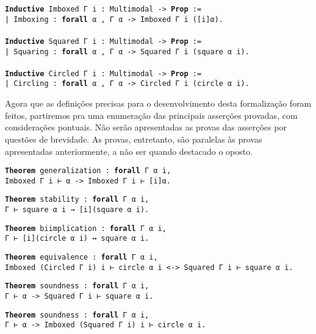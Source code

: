 \begin{mdframed}
\noindent
\texttt
{\noindent\footnotesize\textbf{Inductive} Imboxed Γ i : Multimodal -> \textbf{Prop} :=\\
| Imboxing : \textbf{forall} α , Γ α  -> Imboxed Γ i ([i]α).
\\
\\
\textbf{Inductive} Squared Γ i : Multimodal -> \textbf{Prop} :=\\
| Squaring : \textbf{forall} α , Γ α  -> Squared Γ i (square α i).
\\
\\
\textbf{Inductive} Circled Γ i : Multimodal -> \textbf{Prop} :=\\
| Circling : \textbf{forall} α , Γ α  -> Circled Γ i (circle α i).
}
\end{mdframed}
\hfill\break
Agora que as definições precisas para o desenvolvimento desta formalização foram feitos, partiremos pra uma enumeração das principais asserções provadas, com considerações pontuais.
Não serão apresentadas as provas das asserções por questões de brevidade.
As provas, entretanto, são paralelas às provas apresentadas anteriormente, a não ser quando destacado o oposto.
\hfill\break
\begin{mdframed}
\texttt{\noindent\footnotesize\textbf{Theorem} generalization : \textbf{forall} Γ α i,\\Imboxed Γ i ⊢ α -> Imboxed Γ i ⊢ [i]α.}
\end{mdframed}

\begin{mdframed}
\texttt{\noindent\footnotesize\textbf{Theorem} stability : \textbf{forall} Γ α i,\\Γ ⊢ square α i → [i](square α i).}
\end{mdframed}

\begin{mdframed}
\texttt{\noindent\footnotesize\textbf{Theorem} biimplication : \textbf{forall} Γ α i,\\Γ ⊢ [i](circle α i) ↔ square α i.}
\end{mdframed}

\begin{mdframed}
\texttt{\noindent\footnotesize\textbf{Theorem} equivalence : \textbf{forall} Γ α i,\\Imboxed (Circled Γ i) i ⊢ circle α i <-> Squared Γ i ⊢ square α i.}
\end{mdframed}

\begin{mdframed}
\texttt{\noindent\footnotesize\textbf{Theorem} soundness : \textbf{forall} Γ α i,\\Γ ⊢ α -> Squared Γ i ⊢ square α i.}
\end{mdframed}

\begin{mdframed}
\texttt{\noindent\footnotesize\textbf{Theorem} soundness : \textbf{forall} Γ α i,\\Γ ⊢ α -> Imboxed (Squared Γ i) i ⊢ circle α i.}
\end{mdframed}
